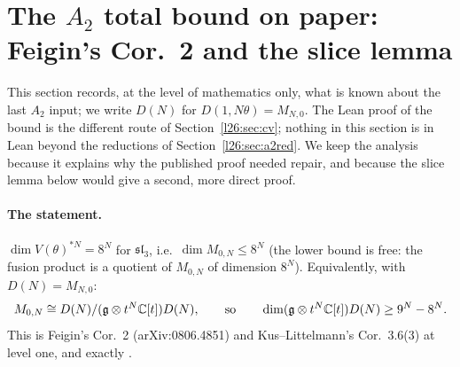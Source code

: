 \section[The $A_2$ total bound on paper]{The $A_2$ total bound on paper: Feigin's Cor.~2 and the slice lemma}\label{l26:sec:open}

This section records, at the level of mathematics only, what is known about the last $A_2$ input; we write $D(N)$ for
$D(1,N\theta)=M_{N,0}$. The Lean proof of the bound is the different route of Section~\ref{l26:sec:cv}; nothing in this
section is in Lean beyond the reductions of Section~\ref{l26:sec:a2red}. We keep the analysis because it explains why the
published proof needed repair, and because the slice lemma below would give a second, more direct proof.

\paragraph{The statement.} $\dim V(\theta)^{*N}=8^N$ for $\mathfrak{sl}_3$, i.e.\ $\dim M_{0,N}\le8^N$ (the lower bound is
free: the fusion product is a quotient of $M_{0,N}$ of dimension $8^N$). Equivalently, with $D(N)=M_{N,0}$:
\begin{equation*}
M_{0,N}\cong D(N)/(\mathfrak g\otimes t^N{\mathbb{C}}[t])D(N),\qquad\text{so}\qquad \dim(\mathfrak g\otimes t^N{\mathbb{C}}[t])D(N)\ge9^N-8^N .
\end{equation*}
This is Feigin's Cor.~2 (arXiv:0806.4851) and Kus--Littelmann's Cor.~3.6(3) at level one, and exactly .

